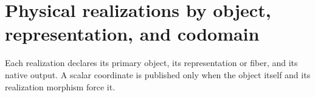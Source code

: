 \section{Physical realizations by object, representation, and codomain}
Each realization declares its primary object, its representation or fiber,
and its native output. A scalar coordinate is published only when the
object itself and its realization morphism force it.

